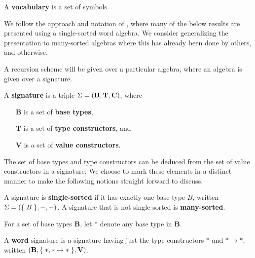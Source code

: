 \begin{definition} A \textbf{vocabulary} is a set of symbols \end{definition} 

We follow the approach and notation of \cite{clote-1999}, where many of the
below results are presented using a single-sorted word algebra. We consider
generalizing the presentation to many-sorted algebras where this has already
been done by others, and otherwise.

A recursion scheme will be given over a particular algebra, where an algebra is
given over a signature.

\begin{definition} A \textbf{signature} is a triple $\Sigma = {\mathopen{}\left({\mathbf{B},
\mathbf{T}, \mathbf{C}}\right)\mathclose{}}$, where

\begin{enumerate}

\item [$\mathbf{B}$] is a set of \textbf{base types},

\item [$\mathbf{T}$] is a set of \textbf{type constructors}, and

\item [$\mathbf{V}$] is a set of \textbf{value constructors}.

\end{enumerate}

\end{definition}

The set of base types and type constructors can be deduced from the set of
value constructors in a signature. We choose to mark these elements in a
distinct manner to make the following notions straight forward to discuss.

\begin{definition} A signature is \textbf{single-sorted} if it has exactly one
base type $B$, written $\Sigma = {\mathopen{}\left({\mathopen{}\left\{\mathrel{}{B}\mathrel{}\right\}\mathclose{}, -, -}\right)\mathclose{}}$. A signature that is not
single-sorted is \textbf{many-sorted}.  \end{definition}

\begin{definition} For a set of base types $\mathbf{B}$, let $*$ denote any
base type in $\mathbf{B}$. \end{definition}

\begin{definition} A \textbf{word} signature is a signature having just the
type constructors $*$ and $* \rightarrow *$, written ${\mathopen{}\left({\mathbf{B}, \mathopen{}\left\{\mathrel{}{*, *
\rightarrow *}\mathrel{}\right\}\mathclose{}, \mathbf{V}}\right)\mathclose{}}$.  \end{definition}

